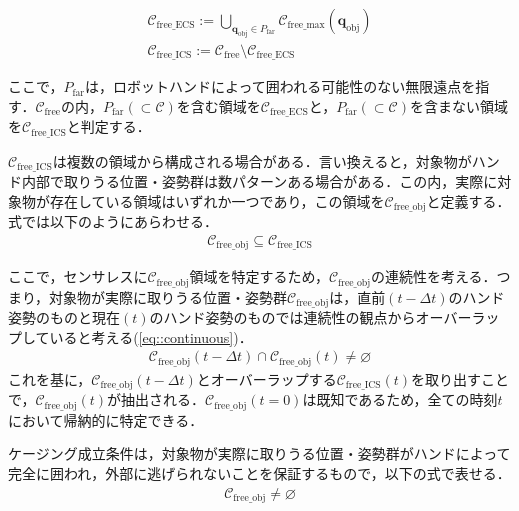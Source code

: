 \documentclass[a4paper,twoside,12pt,papersize, dvipdfmx]{iirthesis}
\begin{document}
\begin{gather}
\mathcal{C}_{\mathrm{free\_ECS}} := 
\bigcup_{\bm{q}_{\mathrm{obj}}\in P_{\mathrm{far}}}
\mathcal{C}_{\mathrm{free\_max}}(\bm{q}_{\mathrm{obj}}) \\
\mathcal{C}_{\mathrm{free\_ICS}} := \mathcal{C}_{\mathrm{free}} 
\setminus \mathcal{C}_{\mathrm{free\_ECS}}
\end{gather}

ここで，$P_{\mathrm{far}}$は，ロボットハンドによって囲われる可能性のない無限遠点を指す．$\mathcal{C}_{\mathrm{free}}$の内，$P_{\mathrm{far}} (\subset \mathcal{C})$を含む領域を$\mathcal{C}_{\mathrm{free\_ECS}}$と，$P_{\mathrm{far}} (\subset \mathcal{C})$を含まない領域を$\mathcal{C}_{\mathrm{free\_ICS}}$と判定する．\par

$\mathcal{C}_{\mathrm{free\_ICS}}$は複数の領域から構成される場合がある．言い換えると，対象物がハンド内部で取りうる位置・姿勢群は数パターンある場合がある．この内，実際に対象物が存在している領域はいずれか一つであり，この領域を$\mathcal{C}_{\mathrm{free\_obj}}$と定義する．式では以下のようにあらわせる．
\begin{gather}
\mathcal{C}_{\mathrm{free\_obj}} \subseteq \mathcal{C}_{\mathrm{free\_ICS}}
\end{gather}

ここで，センサレスに$\mathcal{C}_{\mathrm{free\_obj}}$領域を特定するため，$\mathcal{C}_{\mathrm{free\_obj}}$の連続性を考える．つまり，対象物が実際に取りうる位置・姿勢群$\mathcal{C}_{\mathrm{free\_obj}}$は，直前$(t-\Delta t)$のハンド姿勢のものと現在$(t)$のハンド姿勢のものでは連続性の観点からオーバーラップしていると考える(\eqref{eq::continuous})．
\begin{gather}\label{eq::continuous}
\mathcal{C}_{\mathrm{free\_obj}}(t-\Delta t) \cap 
\mathcal{C}_{\mathrm{free\_obj}}(t) \neq \varnothing
\end{gather}
これを基に，$\mathcal{C}_{\mathrm{free\_obj}}(t-\Delta t)$とオーバーラップする$\mathcal{C}_{\mathrm{free\_ICS}}(t)$を取り出すことで，$\mathcal{C}_{\mathrm{free\_obj}}(t)$が抽出される．$\mathcal{C}_{\mathrm{free\_obj}}(t=0)$は既知であるため，全ての時刻$t$において帰納的に特定できる．

ケージング成立条件は，対象物が実際に取りうる位置・姿勢群がハンドによって完全に囲われ，外部に逃げられないことを保証するもので，以下の式で表せる．
\begin{gather}
\mathcal{C}_{\mathrm{free\_obj}} \neq \varnothing
\end{gather}
\end{document}
